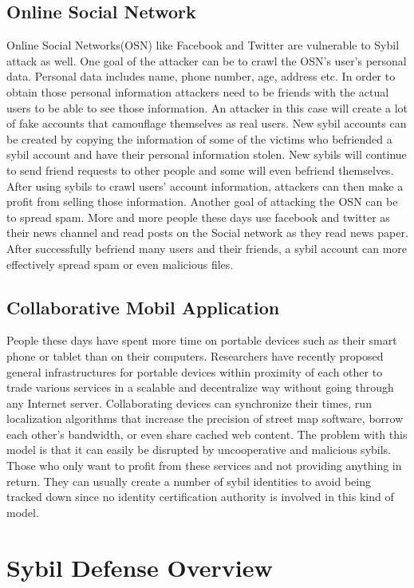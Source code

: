 \documentclass[conference]{IEEEtran}
\begin{document}
\subsection{Online Social Network}
Online Social Networks(OSN) like Facebook and Twitter are vulnerable to Sybil attack as well. One goal of the attacker can be to crawl the OSN's user's personal data.
Personal data includes name, phone number, age, address etc. In order to obtain those personal information
attackers need to be friends with the actual users to be able to see those information.
An attacker in this case will create a lot of fake accounts that camouflage themselves as real users. New sybil accounts can be created by copying the information of some of the victims
who befriended a sybil account and have their personal information stolen. New sybils will continue to send friend requests to other people and some will even befriend themselves.
After using sybils to crawl users' account information, attackers can then make a profit from selling those information. Another goal of attacking the OSN can be to spread spam.
More and more people these days use facebook and twitter as their news channel and read posts on the Social network as they read news paper. 
After successfully befriend many users and their friends, a sybil account can more effectively spread spam or even malicious files.

\subsection{Collaborative Mobil Application}
People these days have spent more time on portable devices such as their smart phone or tablet than on their computers.
Researchers have recently proposed general infrastructures for portable devices within proximity of each other to trade various services
in a scalable and decentralize way without going through any Internet server. Collaborating devices can synchronize their times, run localization algorithms 
that increase the precision of street map software, borrow each other's bandwidth, or even share cached web content. The problem with this model is that it can 
easily be disrupted by uncooperative and malicious sybils. Those who only want to profit from these services and not providing anything in return.
They can usually create a number of sybil identities to avoid being tracked down since no identity certification authority is involved in this kind of model.\cite{quercia10mobile}

\section{Sybil Defense Overview} \label{SybilDefense}
\end{document}
